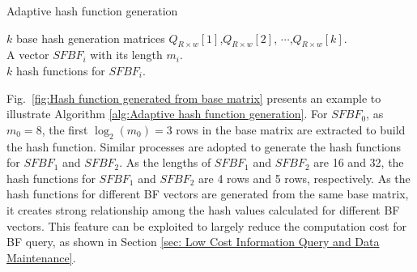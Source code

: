 \documentclass[10pt,journal,letterpaper]{IEEEtran}
\begin{document}
\begin{algorithm}[h]
\caption{Adaptive hash function generation}
\label{alg:Adaptive hash function generation}
\begin{algorithmic}[1]
\REQUIRE
$k$ base hash generation matrices ${Q_{R \times w}}[1]$,${Q_{R \times w}}[2]$, $\cdots$,${Q_{R \times w}}[k]$. \\
A vector $SFBF_i$ with its length $m_i$.\\
\ENSURE
$k$ hash functions for $SFBF_i$.\\

\end{algorithmic}
\end{algorithm}

Fig.~\ref{fig:Hash function generated from base matrix} presents an example to illustrate Algorithm \ref{alg:Adaptive hash function generation}. For $SFBF_0$, as $m_0=8$, the first ${\log _2}\left( {{m_0}} \right)=3$ rows in the base matrix are extracted to build the hash function. Similar processes are adopted to generate the hash functions for $SFBF_1$ and $SFBF_2$. As the lengths of $SFBF_1$ and $SFBF_2$ are 16 and 32, the hash functions for $SFBF_1$ and $SFBF_2$ are 4 rows and 5 rows, respectively.  As the hash functions for different BF vectors are generated from the same base matrix, it creates strong relationship among the hash values calculated for different BF vectors. This feature can be exploited to largely reduce the computation cost for BF query, as shown in Section \ref{sec: Low Cost Information Query and Data Maintenance}.
\end{document}

